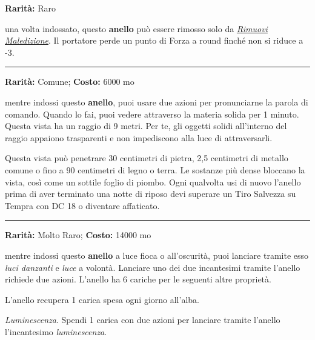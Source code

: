 \begin{multicols}{2}
\textbf{Rarità:} Raro

una volta indossato, questo \textbf{anello} può essere rimosso solo da \emph{\hyperlink{Rimuovi Maledizione}{Rimuovi Maledizione}}. Il portatore perde un punto di Forza a round finché non si riduce a -3.

\smallskip\noindent\rule{\linewidth}{2pt}  \hypertarget{AnellodellaVistaaiRaggiX}{}\medskip{}\noindent\label{AnellodellaVistaaiRaggiX}

\textbf{Rarità:} Comune; \textbf{Costo:} 6000 mo

mentre indossi questo \textbf{anello}, puoi usare due azioni per pronunciarne la parola di comando. Quando lo fai, puoi vedere attraverso la materia solida per 1 minuto. Questa vista ha un raggio di 9 metri. Per te, gli oggetti solidi all'interno del raggio appaiono trasparenti e non impediscono alla luce di attraversarli.

Questa vista può penetrare 30 centimetri di pietra, 2,5 centimetri di metallo comune o fino a 90 centimetri di legno o terra. Le sostanze più dense bloccano la vista, così come un sottile foglio di piombo. Ogni qualvolta usi di nuovo l'anello prima di aver terminato una notte di riposo devi superare un Tiro Salvezza su Tempra con DC 18 o diventare affaticato.

\smallskip\noindent\rule{\linewidth}{2pt}  \hypertarget{AnellodelleStelleCadenti}{}\medskip{}\noindent\label{AnellodelleStelleCadenti}

\textbf{Rarità:} Molto Raro; \textbf{Costo:} 14000 mo

mentre indossi questo \textbf{anello} a luce fioca o all'oscurità, puoi lanciare tramite esso \emph{luci danzanti} e \emph{luce} a volontà. Lanciare uno dei due incantesimi tramite l'anello richiede due azioni. L'anello ha 6 cariche per le seguenti altre proprietà.

L'anello recupera 1 carica spesa ogni giorno all'alba.

\emph{Luminescenza}. Spendi 1 carica con due azioni per lanciare tramite l'anello l'incantesimo \emph{luminescenza}.


\end{multicols}
